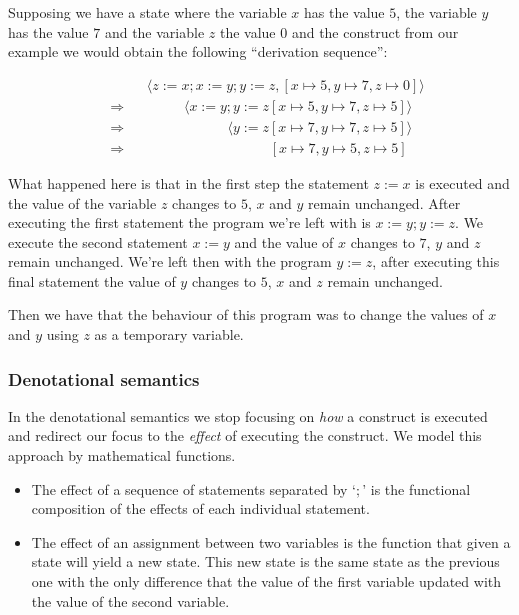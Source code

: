 Supposing we have a state where the variable $x$ has the value $5$, the variable $y$ has the value $7$ and the variable $z$ the value $0$ and the construct from our example we would obtain the following \enquote{derivation sequence}:

\begin{equation*}
\begin{split}
& \phantom{\Rightarrow} \phantom{=} \langle z:=x; x:=y; y:=z, [x\mapsto5, y\mapsto7, z\mapsto0]\rangle\\
& \Rightarrow \phantom{=} \phantom{z:=x} \langle x:=y; y:=z [x\mapsto5, y\mapsto7, z\mapsto5]\rangle\\
& \Rightarrow \phantom{=} \phantom{z:=x; x:=y} \langle y:=z [x\mapsto7, y\mapsto7, z\mapsto5]\rangle\\
& \Rightarrow \phantom{=} \phantom{z:=x; x:=y; y:=z} [x\mapsto7, y\mapsto5, z\mapsto5]
\end{split}
\end{equation*}

What happened here is that in the first step the statement $z:=x$ is executed and the value of the variable $z$ changes to $5$, $x$ and $y$ remain unchanged.
After executing the first statement the program we're left with is $x:=y; y:=z$.
We execute the second statement $x:=y$ and the value of $x$ changes to $7$, $y$ and $z$ remain unchanged.
We're left then with the program $y:=z$, after executing this final statement the value of $y$ changes to $5$, $x$ and $z$ remain unchanged.

Then we have that the behaviour of this program was to change the values of $x$ and $y$ using $z$ as a temporary variable.


\subsubsection{Denotational semantics}
In the denotational semantics we stop focusing on \textit{how} a construct is executed and redirect our focus to the \textit{effect} of executing the construct.
We model this approach by mathematical functions.

\begin{itemize}
\item{The effect of a sequence of statements separated by `$;$' is the functional composition of the effects of each individual statement.}
\item{The effect of an assignment between two variables is the function that given a state will yield a new state.
This new state is the same state as the previous one with the only difference that the value of the first variable updated with the value of the second variable.}
\end{itemize}

